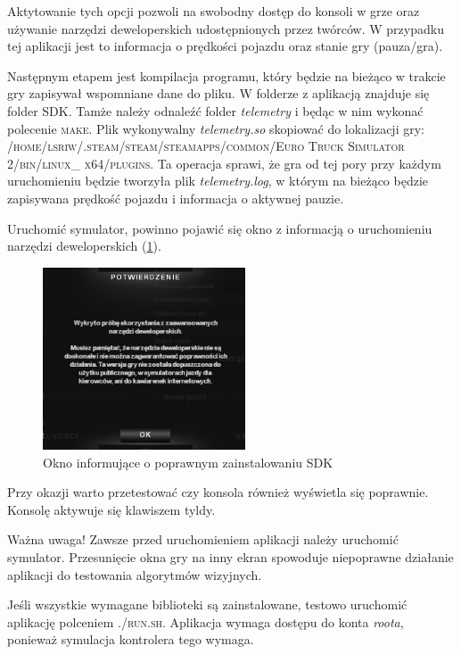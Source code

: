 Aktytowanie tych opcji pozwoli na swobodny dostęp do konsoli w grze oraz używanie narzędzi deweloperskich udostępnionych przez twórców. W przypadku tej aplikacji jest to informacja o prędkości pojazdu oraz stanie gry (pauza/gra).

Następnym etapem jest kompilacja programu, który będzie na bieżąco w trakcie gry zapisywał wspomniane dane do pliku. W folderze z aplikacją znajduje się folder SDK. Tamże należy odnaleźć folder \textit{telemetry} i będąc w nim wykonać polecenie \textsc{make}. Plik wykonywalny \textit{telemetry.so} skopiować do lokalizacji gry: \textsc{/home/lsriw/.steam/steam/steamapps/common/Euro Truck Simulator 2/bin/linux\_ x64/plugins}. Ta operacja sprawi, że gra od tej pory przy każdym uruchomieniu będzie tworzyła plik \textit{telemetry.log}, w którym na bieżąco będzie zapisywana prędkość pojazdu i informacja o aktywnej pauzie. 

Uruchomić symulator, powinno pojawić się okno z informacją o uruchomieniu narzędzi deweloperskich (\ref{fig:appendix1_dev_tools}).

\begin{figure}
  \centering
  \includegraphics[width=6cm]{img/appendix1_devtools.png}
  \caption{Okno informujące o poprawnym zainstalowaniu SDK}
  \label{fig:appendix1_dev_tools}
\end{figure}

Przy okazji warto przetestować czy konsola również wyświetla się poprawnie. Konsolę aktywuje się klawiszem tyldy.

Ważna uwaga! Zawsze przed uruchomieniem aplikacji należy uruchomić symulator. Przesunięcie okna gry na inny ekran spowoduje niepoprawne działanie aplikacji do testowania algorytmów wizyjnych.

Jeśli wszystkie wymagane biblioteki są zainstalowane, testowo uruchomić aplikację polceniem \textsc{./run.sh}. Aplikacja wymaga dostępu do konta \textit{roota}, ponieważ symulacja kontrolera tego wymaga.

